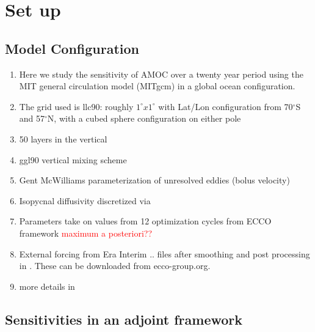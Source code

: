 \documentclass[a4paper,11pt]{article}
\newcommand{\red}[1]{\textcolor{red}{#1}}
\begin{document}
\section{Set up}
\label{setup}
  \subsection{Model Configuration}

	\begin{enumerate}
	  \item Here we study the sensitivity of AMOC over a twenty year period using the MIT general circulation model (MITgcm) in a global ocean configuration.
	  \item The grid used is llc90: roughly $1^{\circ} x 1^{\circ}$ with Lat/Lon configuration from 70$^{\circ}$S and 57$^{\circ}$N, with a cubed sphere configuration on either pole
	  \item 50 layers in the vertical 
	  \item ggl90 vertical mixing scheme \cite{ggl90}
	  \item Gent McWilliams parameterization of unresolved eddies (bolus velocity) \cite{GM}
	  \item Isopycnal diffusivity discretized via \cite{Redi}
	  \item Parameters take on values from 12 optimization cycles from ECCO framework \red{maximum a posteriori??}
	  \item External forcing from Era Interim .. files after smoothing and post processing in \cite{forgetECCOv4}. These can be downloaded from ecco-group.org.
	  \item more details in \cite{forgetECCOv4}
	\end{enumerate}

  \subsection{Sensitivities in an adjoint framework}
\end{document}
